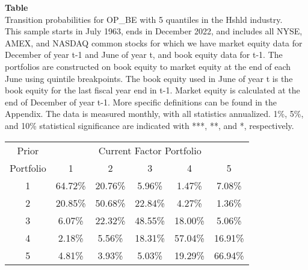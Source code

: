\begin{table*}[ht!]
\raggedright
{}
\label{tab: transition_probs_OP_BE_Hshld_with_5_quantiles}
\textbf{Table \thetable} \\
Transition probabilities for OP_BE with 5 quantiles in the Hshld industry. \\
\hspace*{1em}This sample starts in July 1963, ends in December 2022, and includes all NYSE, AMEX, and NASDAQ common stocks for which we have market equity data for December of year t-1 and June of year t, and book equity data for t-1. The portfolios are constructed on book equity to market equity at the end of each June using quintile breakpoints.  The book equity used in June of year t is the book equity for the last fiscal year end in t-1.  Market equity is calculated at the end of December of year t-1.  More specific definitions can be found in the Appendix.  The data is measured monthly, with all statistics annualized.  1\%, 5\%, and 10\% statistical significance are indicated with ***, **, and *, respectively. \\
\vspace{0.5em}
\centering
\begin{adjustbox}{max width=\textwidth}
\begin{tabular}{@{}cccccc@{}}
\toprule
Prior & \multicolumn{5}{c}{Current Factor Portfolio} \\
Portfolio & 1 & 2 & 3 & 4 & 5 \\
\midrule
1 & 64.72\% & 20.76\% & 5.96\% & 1.47\% & 7.08\% \\
2 & 20.85\% & 50.68\% & 22.84\% & 4.27\% & 1.36\% \\
3 & 6.07\% & 22.32\% & 48.55\% & 18.00\% & 5.06\% \\
4 & 2.18\% & 5.56\% & 18.31\% & 57.04\% & 16.91\% \\
5 & 4.81\% & 3.93\% & 5.03\% & 19.29\% & 66.94\% \\
\bottomrule
\end{tabular}
\end{adjustbox}
\end{table*}